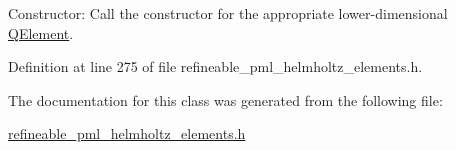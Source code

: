 Constructor\+: Call the constructor for the appropriate lower-\/dimensional \hyperlink{classoomph_1_1QElement}{Q\+Element}. 



Definition at line 275 of file refineable\+\_\+pml\+\_\+helmholtz\+\_\+elements.\+h.



The documentation for this class was generated from the following file\+:\begin{DoxyCompactItemize}
\item 
\hyperlink{refineable__pml__helmholtz__elements_8h}{refineable\+\_\+pml\+\_\+helmholtz\+\_\+elements.\+h}\end{DoxyCompactItemize}
